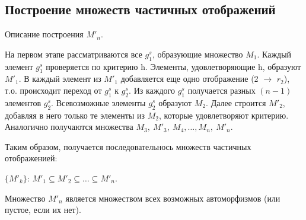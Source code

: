 \subsection{Построение множеств частичных отображений}

Описание построения $M'_n$.

На первом этапе рассматриваются все $g^s_1$, образующие множество $M_1$. Каждый элемент $g^s_1$ проверяется по критерию h. Элементы, удовлетворяющие h, образуют $M'_1$. В каждый элемент из $M'_1$ добавляется еще одно отображение (2 $\to$ $r_2$), т.о. происходит переход от $g^s_1$ к $g^s_2$. Из каждого $g^s_1$ получается разных $(n-1)$ элементов $g^s_2$. Всевозможные элементы $g^s_2$ образуют $M_2$. Далее строится $M'_2$, добавляя в него только те элементы из $M_2$, которые удовлетворяют критерию. Аналогично получаются множества $M_3,\ M'_3,\ M_4,\ldots, M_n,\ M'_n$.


Таким образом, получается последовательнось множеств частичных отображенией:

$\{M'_k\}$: $M'_1 \subseteq M'_2 \subseteq \ldots \subseteq M'_n$.

Множество $M'_n$ является множеством всех возможных автоморфизмов (или пустое, если их нет).